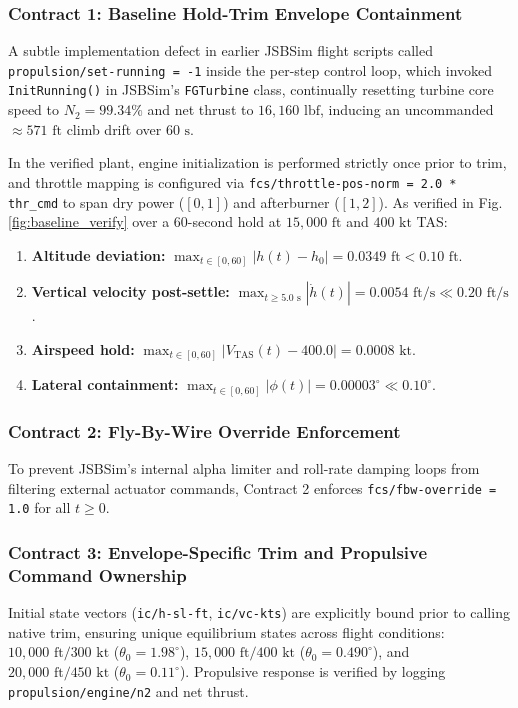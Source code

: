\documentclass[review,12pt]{elsarticle}
\begin{document}
\subsubsection{Contract 1: Baseline Hold-Trim Envelope Containment}
A subtle implementation defect in earlier JSBSim flight scripts called \texttt{propulsion/set-running = -1} inside the per-step control loop, which invoked \texttt{InitRunning()} in JSBSim's \texttt{FGTurbine} class, continually resetting turbine core speed to $N_2 = 99.34\%$ and net thrust to $16{,}160\text{ lbf}$, inducing an uncommanded $\approx 571\text{ ft}$ climb drift over $60\text{ s}$. 

In the verified plant, engine initialization is performed strictly once prior to trim, and throttle mapping is configured via \texttt{fcs/throttle-pos-norm = 2.0 * thr\_cmd} to span dry power ($[0, 1]$) and afterburner ($[1, 2]$). As verified in Fig. \ref{fig:baseline_verify} over a 60-second hold at $15{,}000\text{ ft}$ and $400\text{ kt}$ TAS:
\begin{enumerate}
    \item \textbf{Altitude deviation:} $\max_{t \in [0, 60]} |h(t) - h_0| = 0.0349\text{ ft} < 0.10\text{ ft}$.
    \item \textbf{Vertical velocity post-settle:} $\max_{t \ge 5.0\text{ s}} |\dot{h}(t)| = 0.0054\text{ ft/s} \ll 0.20\text{ ft/s}$.
    \item \textbf{Airspeed hold:} $\max_{t \in [0, 60]} |V_{\text{TAS}}(t) - 400.0| = 0.0008\text{ kt}$.
    \item \textbf{Lateral containment:} $\max_{t \in [0, 60]} |\phi(t)| = 0.00003^\circ \ll 0.10^\circ$.
\end{enumerate}

\subsubsection{Contract 2: Fly-By-Wire Override Enforcement}
To prevent JSBSim's internal alpha limiter and roll-rate damping loops from filtering external actuator commands, Contract 2 enforces \texttt{fcs/fbw-override = 1.0} for all $t \ge 0$.

\subsubsection{Contract 3: Envelope-Specific Trim and Propulsive Command Ownership}
Initial state vectors (\texttt{ic/h-sl-ft}, \texttt{ic/vc-kts}) are explicitly bound prior to calling native trim, ensuring unique equilibrium states across flight conditions: $10{,}000\text{ ft}/300\text{ kt}$ ($\theta_0 = 1.98^\circ$), $15{,}000\text{ ft}/400\text{ kt}$ ($\theta_0 = 0.490^\circ$), and $20{,}000\text{ ft}/450\text{ kt}$ ($\theta_0 = 0.11^\circ$). Propulsive response is verified by logging \texttt{propulsion/engine/n2} and net thrust.
\end{document}

